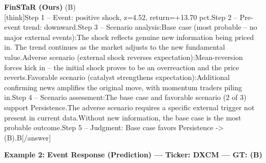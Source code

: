 \begin{minipage}[t]{0.41\textwidth}
\colorbox{green!10}{\parbox{\dimexpr\textwidth-2\fboxsep}{
\textbf{FinSTaR (Ours)} \textcolor{green!50!black}{(B)} \\[2pt]
\tiny
[think]\newline Step 1 -- Event: positive shock, z=4.52, return=+13.70 pct.\newline Step 2 -- Pre-event trend: downward.\newline Step 3 -- Scenario analysis:\newline   Base case (most probable -- no major external events):\newline     The shock reflects genuine new information being priced in. The trend continues as the market adjusts to the new fundamental value.\newline   Adverse scenario (external shock reverses expectation):\newline     Mean-reversion forces kick in -- the initial shock proves to be an overreaction and the price reverts.\newline   Favorable scenario (catalyst strengthens expectation):\newline     Additional confirming news amplifies the original move, with momentum traders piling in.\newline Step 4 -- Scenario assessment:\newline   The base case and favorable scenario (2 of 3) support Persistence.\newline   The adverse scenario requires a specific external trigger not present in current data.\newline   Without new information, the base case is the most probable outcome.\newline Step 5 -- Judgment: Base case favors Persistence -> (B).\newline [/think]\newline [answer]B[/answer]
}}
\end{minipage}
\vspace{8pt}


\noindent
\textbf{Example 2: Event Response (Prediction) --- Ticker: DXCM --- GT: (B)}
\vspace{2pt}

